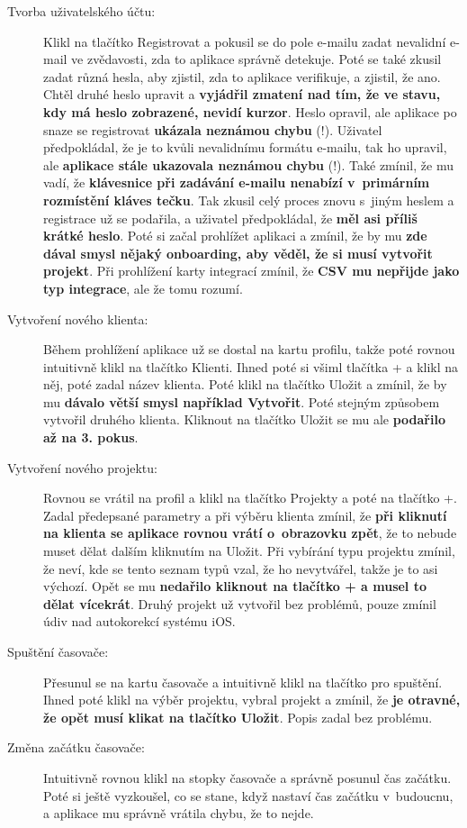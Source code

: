 \begin{description}
\item[Tvorba uživatelského účtu:] Klikl na tlačítko Registrovat a pokusil se do pole e-mailu zadat nevalidní e-mail ve zvědavosti, zda to aplikace správně detekuje. Poté se také zkusil zadat různá hesla, aby zjistil, zda to aplikace verifikuje, a zjistil, že ano. Chtěl druhé heslo upravit a \textbf{vyjádřil zmatení nad tím, že ve stavu, kdy má heslo zobrazené, nevidí kurzor}. Heslo opravil, ale aplikace po snaze se registrovat \textbf{ukázala neznámou chybu} (!). Uživatel předpokládal, že je to kvůli nevalidnímu formátu e-mailu, tak ho upravil, ale \textbf{aplikace stále ukazovala neznámou chybu} (!). Také zmínil, že mu vadí, že \textbf{klávesnice při zadávání e-mailu nenabízí v~primárním rozmístění kláves tečku}. Tak zkusil celý proces znovu s~jiným heslem a registrace už se podařila, a uživatel předpokládal, že \textbf{měl asi příliš krátké heslo}. Poté si začal prohlížet aplikaci a zmínil, že by mu \textbf{zde dával smysl nějaký onboarding, aby věděl, že si musí vytvořit projekt}. Při prohlížení karty integrací zmínil, že \textbf{CSV mu nepřijde jako typ integrace}, ale že tomu rozumí.
\item[Vytvoření nového klienta:] Během prohlížení aplikace už se dostal na kartu profilu, takže poté rovnou intuitivně klikl na tlačítko Klienti. Ihned poté si všiml tlačítka + a klikl na něj, poté zadal název klienta. Poté klikl na tlačítko Uložit a zmínil, že by mu \textbf{dávalo větší smysl například Vytvořit}. Poté stejným způsobem vytvořil druhého klienta. Kliknout na tlačítko Uložit se mu ale \textbf{podařilo až na 3. pokus}.
\item[Vytvoření nového projektu:] Rovnou se vrátil na profil a klikl na tlačítko Projekty a poté na tlačítko +. Zadal předepsané parametry a při výběru klienta zmínil, že \textbf{při kliknutí na klienta se aplikace rovnou vrátí o~obrazovku zpět}, že to nebude muset dělat dalším kliknutím na Uložit. Při vybírání typu projektu zmínil, že neví, kde se tento seznam typů vzal, že ho nevytvářel, takže je to asi výchozí. Opět se mu \textbf{nedařilo kliknout na tlačítko + a musel to dělat vícekrát}. Druhý projekt už vytvořil bez problémů, pouze zmínil údiv nad autokorekcí systému iOS.
\item[Spuštění časovače:] Přesunul se na kartu časovače a intuitivně klikl na tlačítko pro spuštění. Ihned poté klikl na výběr projektu, vybral projekt a zmínil, že \textbf{je otravné, že opět musí klikat na tlačítko Uložit}. Popis zadal bez problému.
\item[Změna začátku časovače:] Intuitivně rovnou klikl na stopky časovače a správně posunul čas začátku. Poté si ještě vyzkoušel, co se stane, když nastaví čas začátku v~budoucnu, a aplikace mu správně vrátila chybu, že to nejde.

\end{description}
